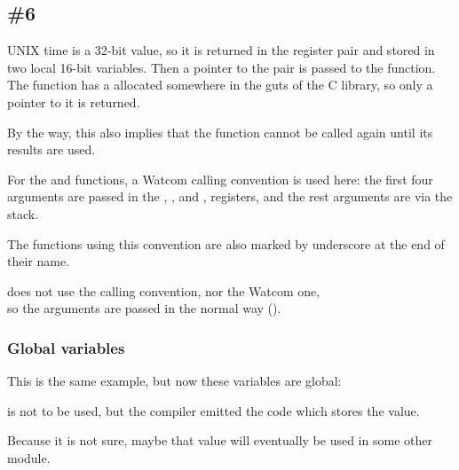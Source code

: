 \subsection{\Example{} \#6}






UNIX time is a 32-bit value, so it is returned in the  register pair and stored in two local 16-bit variables.
Then a pointer to the pair is passed to the
 function.
The  function has a  
allocated somewhere in the guts of the C library, so only a pointer to it is returned. 

By the way, this also implies that the function cannot be called again until its results are used.

For the  and  
functions, a Watcom calling convention is used here:
the first four arguments are passed in the , ,  and , 
registers, and the rest arguments are via the stack.

The functions using this convention are also marked by underscore at the end of their name.

 does not use the  calling convention, nor the Watcom one,\\ %
so the arguments are passed in the normal  way ().

\subsubsection{Global variables}

This is the same example, but now these variables are global:





 is not to be used, but the compiler emitted the code which stores the value.

Because it is not sure, maybe that value will eventually be used in some other module.
